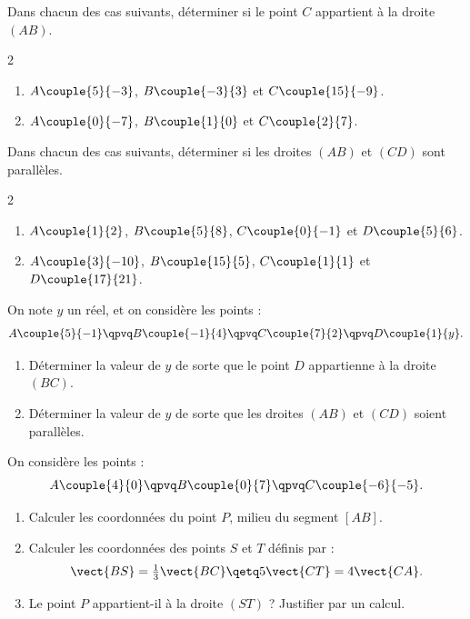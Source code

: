 \exo

Dans chacun des cas suivants, déterminer si le point $C$ appartient à la droite $(AB)$.

\vspace{-6pt}
\setlength{\columnsep}{1cm}
\setlength{\columnseprule}{0pt}
\begin{multicols}{2}
\begin{enumerate}
\item $A\couple{5}{-3}$, $B\couple{-3}{3}$ et $C\couple{15}{-9}$.
\item $A\couple{0}{-7}$, $B\couple{1}{0}$ et $C\couple{2}{7}$.
\end{enumerate}
\end{multicols}
\vspace{-6pt}

\exo

Dans chacun des cas suivants, déterminer si les droites $(AB)$ et $(CD)$ sont parallèles.

\vspace{-6pt}
\setlength{\columnsep}{1cm}
\setlength{\columnseprule}{0pt}
\begin{multicols}{2}
\begin{enumerate}
\item $A\couple{1}{2}$, $B\couple{5}{8}$, $C\couple{0}{-1}$ et $D\couple{5}{6}$.
\item $A\couple{3}{-10}$, $B\couple{15}{5}$, $C\couple{1}{1}$ et $D\couple{17}{21}$.
\end{enumerate}
\end{multicols}
\vspace{-6pt}

\exo

On note $y$ un réel, et on considère les points :
\[
A\couple{5}{-1}\qpvq B\couple{-1}{4}\qpvq C\couple{7}{2}\qpvq D\couple{1}{y}.
\]
\begin{enumerate}
\item Déterminer la valeur de $y$ de sorte que le point $D$ appartienne à la droite $(BC)$.
\item Déterminer la valeur de $y$ de sorte que les droites $(AB)$ et $(CD)$ soient parallèles.
\end{enumerate}

\exo

On considère les points :
\[
A\couple{4}{0}\qpvq B\couple{0}{7}\qpvq C\couple{-6}{-5}.
\]
\begin{enumerate}
\item Calculer les coordonnées du point $P$, milieu du segment $[AB]$.
\item Calculer les coordonnées des points $S$ et $T$ définis par :
\[
\vect{BS}=\tfrac{1}{3}\vect{BC}
\qetq
5\vect{CT}=4\vect{CA}.
\]
\item Le point $P$ appartient-il à la droite $(ST)$ ? Justifier par un calcul.
\end{enumerate}

